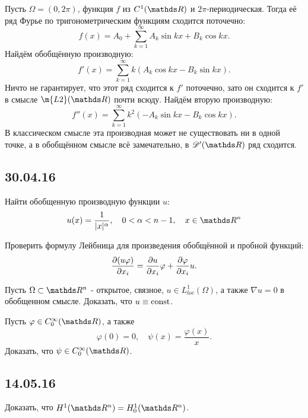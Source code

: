 \begin{note} Пусть $\Omega = (0, 2\pi)$, функция $f$ из $C^1(\real)$ и $2\pi$-периодическая. Тогда её ряд Фурье по тригонометрическим функциям сходится поточечно:
$$ f(x) = A_0 + \sum_{k=1}^\infty A_k \sin kx + B_k \cos kx.$$
Найдём обобщённую производную:
$$ f'(x) = \sum_{k=1}^\infty k(A_k \cos kx - B_k \sin kx).$$
Ничто не гарантирует, что этот ряд сходится к $f'$ поточечно, зато он сходится к $f'$ в смысле $\m{L2}(\real)$ почти всюду. Найдём вторую производную:
$$ f''(x) = \sum_{k=1}^\infty k^2(- A_k \sin kx - B_k \cos kx).$$
В классическом смысле эта производная может не существовать ни в одной точке, а в обобщённом смысле всё замечательно, в $\beauD'(\real)$ ряд сходится.
\end{note}

\subsection*{30.04.16}
\begin{exercise}
Найти обобщенную производную функции $u$:
$$u(x) = \frac {1} {\abs{x}^{\alpha}}, \quad 0 < \alpha < n -1, \quad x \in \real^n$$
\end{exercise}

\begin{exercise}
Проверить формулу Лейбница для произведения обобщённой и пробной функций:
$$\pder[(u \varphi)]{x_i} = \pder[u]{x_i} \varphi + \pder[\varphi]{x_i} u.$$
\end{exercise}

\begin{exercise}
Пусть $\Omega \subset \real^n$ - открытое, связное, $u \in L_{loc}^1(\Omega)$, а также $\nabla u = 0$ в обобщенном смысле. Доказать, что $u \equiv \const$.
\end{exercise}

\begin{exercise} Пусть $\varphi \in C_0^{\infty} (\real)$, а также
$$ \varphi (0) = 0, \quad \psi (x) = \frac {\varphi (x)} {x} .$$
Доказать, что $\psi \in C_0^{\infty} (\real)$.
\end{exercise}

\subsection*{14.05.16}

\begin{exercise} Доказать, что $H^1 (\real^n) = H_0^1 (\real^n)$.
\end{exercise}

